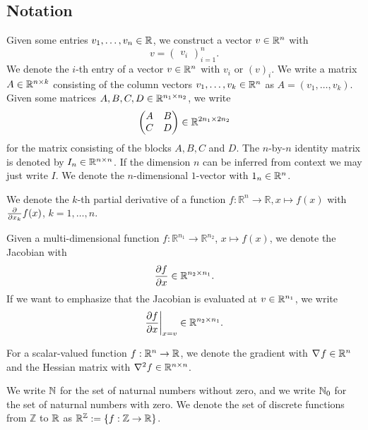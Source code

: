 \documentclass[twoside,a4paper]{article}
\begin{document}
\subsection{Notation}

Given some entries $v_1, \dots, v_n \in \mathbb{R}$, we construct a vector $v \in \mathbb{R}^n$ with
\begin{equation*}
	v = \begin{pmatrix}
		v_i
	\end{pmatrix}_{i=1}^n
	.
\end{equation*}
We denote the $i$-th entry of a vector $v \in \mathbb{R}^n$ with $v_i$ or $(v)_i$.
We write a matrix $A \in \mathbb{R}^{n \times k}$ consisting of the column vectors 
$v_1, \dots, v_k \in \mathbb{R}^n$ as $A = (v_1, \dots, v_k)$.
Given some matrices $A,B,C,D \in \mathbb{R}^{n_1 \times n_2}$, we write
\begin{equation*}
	\begin{pmatrix}
		A & B \\
		C & D
	\end{pmatrix} \in \mathbb{R}^{2n_1 \times 2n_2}
\end{equation*}
for the matrix consisting of the blocks $A,B,C$ and $D$.
The $n$-by-$n$ identity matrix is denoted by $I_n \in \mathbb{R}^{n \times n}$. 
If the dimension $n$ can be inferred from context we may just write $I$.
We denote the $n$-dimensional $1$-vector with $1_{n} \in \mathbb{R}^n$.

We denote the $k$-th partial derivative of a function $f: \mathbb{R}^n \to \mathbb{R},
x \mapsto f(x)$ with $\frac{\partial }{\partial x_k} f(x)$, $k=1, \dots, n$.

Given a multi-dimensional function $f: \mathbb{R}^{n_1} \to \mathbb{R}^{n_2}$,
$x \mapsto f(x)$, we denote the Jacobian with
\begin{equation*}
	\frac{\partial f}{\partial x} \in \mathbb{R}^{n_2 \times n_1}
	.
\end{equation*}
If we want to emphasize that the Jacobian is evaluated at $v \in \mathbb{R}^{n_1}$, we write
\begin{equation*}
	\frac{\partial f}{\partial x} \bigg|_{x = v} \in \mathbb{R}^{n_2 \times n_1}
	.
\end{equation*}

For a scalar-valued function $f : \mathbb{R}^n \to \mathbb{R}$, we denote the gradient with
$\nabla_{}{f} \in \mathbb{R}^n$ and the Hessian matrix with $\nabla^2 f \in \mathbb{R}^{n \times n}$.

We write $\mathbb{N}$ for the set of naturnal numbers without zero, and we write $\mathbb{N}_0$ 
for the set of naturnal numbers with zero. We denote the set of discrete functions from
$\mathbb{Z}$ to $\mathbb{R}$ as $\mathbb{R}^{\mathbb{Z}} := \{ f : \mathbb{Z} \to \mathbb{R} \}$.
\end{document}

